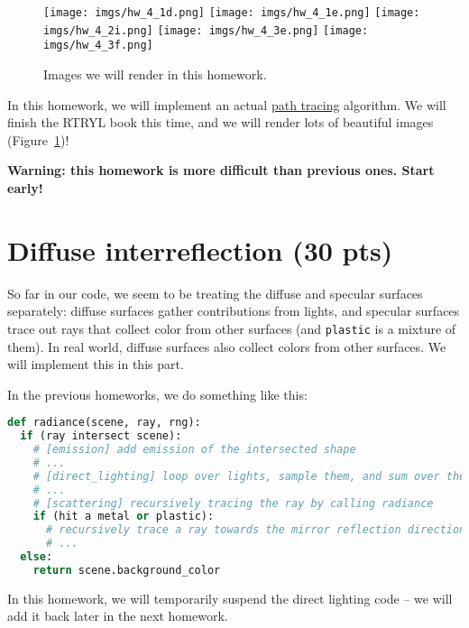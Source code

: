 
\usepackage{xcolor}




\begin{figure}[ht]
    \centering
    \texttt{[image: imgs/hw\_4\_1d.png]}
    \texttt{[image: imgs/hw\_4\_1e.png]}
    \texttt{[image: imgs/hw\_4\_2i.png]}
    \texttt{[image: imgs/hw\_4\_3e.png]}
    \texttt{[image: imgs/hw\_4\_3f.png]}
    \caption{Images we will render in this homework.}
    \label{fig:teaser}
\end{figure}

In this homework, we will implement an actual \href{https://en.wikipedia.org/wiki/Path_tracing}{path tracing} algorithm. We will finish the RTRYL book this time, and we will render lots of beautiful images (Figure~\ref{fig:teaser})!

\textbf{Warning: this homework is more difficult than previous ones. Start early!}

\section{Diffuse interreflection (30 pts)}
So far in our code, we seem to be treating the diffuse and specular surfaces separately: diffuse surfaces gather contributions from lights, and specular surfaces trace out rays that collect color from other surfaces (and \lstinline{plastic} is a mixture of them). In real world, diffuse surfaces also collect colors from other surfaces. We will implement this in this part.

In the previous homeworks, we do something like this:
\begin{lstlisting}[language=python]
def radiance(scene, ray, rng):
  if (ray intersect scene):
    # [emission] add emission of the intersected shape
    # ...
    # [direct_lighting] loop over lights, sample them, and sum over their contributions
    # ...
    # [scattering] recursively tracing the ray by calling radiance
    if (hit a metal or plastic):
      # recursively trace a ray towards the mirror reflection direction
      # ...
  else:
    return scene.background_color
\end{lstlisting}

In this homework, we will temporarily suspend the direct lighting code -- we will add it back later in the next homework.

